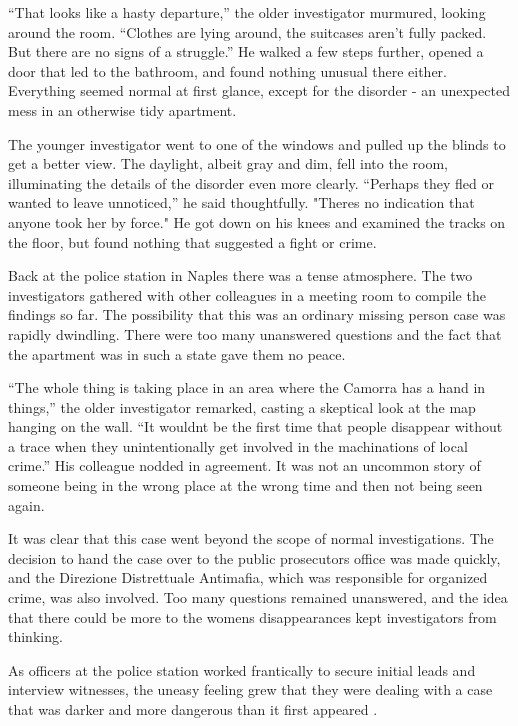 \documentclass[
]{article}
\begin{document}
``That looks like a hasty departure,'' the older investigator murmured,
looking around the room. ``Clothes are lying around, the suitcases
aren't fully packed. But there are no signs of a struggle.'' He walked a
few steps further, opened a door that led to the bathroom, and found
nothing unusual there either. Everything seemed normal at first glance,
except for the disorder - an unexpected mess in an otherwise tidy
apartment.

The younger investigator went to one of the windows and pulled up the
blinds to get a better view. The daylight, albeit gray and dim, fell
into the room, illuminating the details of the disorder even more
clearly. ``Perhaps they fled or wanted to leave unnoticed,'' he said
thoughtfully. "There\textquotesingle s no indication that anyone took
her by force." He got down on his knees and examined the tracks on the
floor, but found nothing that suggested a fight or crime.

Back at the police station in Naples there was a tense atmosphere. The
two investigators gathered with other colleagues in a meeting room to
compile the findings so far. The possibility that this was an ordinary
missing person case was rapidly dwindling. There were too many
unanswered questions and the fact that the apartment was in such a state
gave them no peace.

``The whole thing is taking place in an area where the Camorra has a
hand in things,'' the older investigator remarked, casting a skeptical
look at the map hanging on the wall. ``It wouldn\textquotesingle t be
the first time that people disappear without a trace when they
unintentionally get involved in the machinations of local crime.'' His
colleague nodded in agreement. It was not an uncommon story of someone
being in the wrong place at the wrong time and then not being seen
again.

It was clear that this case went beyond the scope of normal
investigations. The decision to hand the case over to the public
prosecutor\textquotesingle s office was made quickly, and the Direzione
Distrettuale Antimafia, which was responsible for organized crime, was
also involved. Too many questions remained unanswered, and the idea that
there could be more to the women\textquotesingle s disappearances kept
investigators from thinking.

As officers at the police station worked frantically to secure initial
leads and interview witnesses, the uneasy feeling grew that they were
dealing with a case that was darker and more dangerous than it first
appeared .
\end{document}

